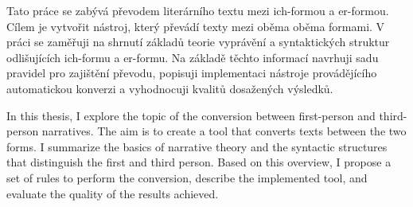 Tato práce se zabývá převodem literárního textu mezi ich-formou a er-formou. Cílem je vytvořit nástroj, který převádí texty mezi oběma oběma formami. V práci se zaměřuji na shrnutí základů teorie vyprávění a syntaktických struktur odlišujících ich-formu a er-formu. Na základě těchto informací navrhuji sadu pravidel pro zajištění převodu, popisuji implementaci nástroje provádějícího automatickou konverzi a vyhodnocuji kvalitů dosažených výsledků.

In this thesis, I explore the topic of the conversion between first-person and third-person narratives. The aim is to create a tool that converts texts between the two forms. I summarize the basics of narrative theory and the syntactic structures that distinguish the first and third person. Based on this overview, I propose a set of rules to perform the conversion, describe the implemented tool, and evaluate the quality of the results achieved.

